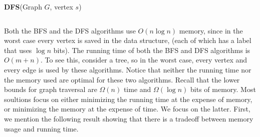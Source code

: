\documentclass[12pt,letterpaper,oneside]{book}
\newtheorem{theorem}{Theorem}[section]
\begin{document}
\begin{center}\begin{tabular*}{\textwidth}{c}\hline\end{tabular*}\end{center}
\noindent \textbf{DFS}(Graph $G$, vertex $s$)
\begin{algorithmic}[1] 
   \ENDIF
  \ENDWHILE
\end{algorithmic}
\begin{center}\begin{tabular*}{\textwidth}{c}\hline\end{tabular*}\end{center}
  

Both the BFS and the DFS algorithms use $O(n\log n)$ memory, since in the worst case every vertex is saved in the data structure, 
(each of which has a label that uses $\log n$ bits).  
The running time of both the BFS and DFS algorithms is $O(m+n)$.  To see this, consider a tree, so in 
the worst case, every vertex and 
every edge is used by these algorithms.  Notice that neither the running time nor the memory used are optimal 
for these two algorithms.  Recall that the lower bounds for graph traversal are $\Omega(n)$ time and $\Omega(\log n)$ bits of memory.  
Most soultions focus on either minimizing the running time at the expense of 
memory, or minimizing the memory at the expense of time.  We focus on the latter.  
First, we mention the following result showing 
that there is a tradeoff between memory usage and running time.  







 
\end{document}
